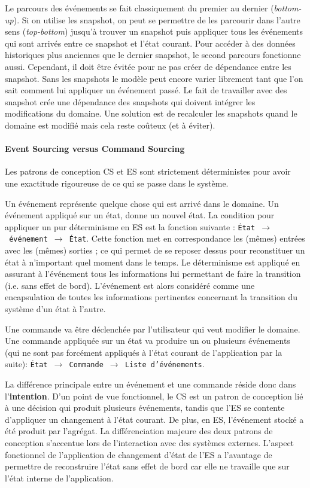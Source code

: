 Le parcours des événements se fait classiquement du premier au dernier 
(\textit{bottom-up}). Si on utilise les \gls{snapshot}, on peut se permettre de les 
parcourir dans l'autre sens (\textit{top-bottom}) jusqu'à trouver un \gls{snapshot} 
puis appliquer tous les événements qui sont arrivés entre ce \gls{snapshot} et 
l'état courant. Pour accéder à des données historiques 
plus anciennes que le dernier \gls{snapshot}, le second parcours fonctionne 
aussi. Cependant, il doit être évitée pour ne pas créer de dépendance entre 
les \gls{snapshot}. Sans les snapshots le modèle peut encore varier 
\og librement \fg{} tant que l'on sait comment lui appliquer un événement passé. 
Le fait de travailler avec des \gls{snapshot} crée une dépendance des 
snapshots qui doivent intégrer les modifications du domaine. Une solution est 
de recalculer les snapshots quand le domaine est modifié mais cela reste 
coûteux (et à éviter).

\paragraph{Event Sourcing versus Command Sourcing}
Les patrons de conception \gls{CS} et \gls{ES} sont strictement déterministes pour 
avoir une exactitude rigoureuse de ce qui se passe dans le système.

Un événement représente quelque chose qui est arrivé dans le domaine. Un 
événement appliqué sur un état, donne un nouvel état. 
La condition pour appliquer un pur déterminisme en \gls{ES} est la fonction 
suivante : \texttt{État~$\rightarrow$~événement~$\rightarrow$~État}. 
Cette fonction met en correspondance les (mêmes) entrées avec les (mêmes) 
sorties ; ce qui permet de se reposer dessus pour reconstituer un état à 
n'important quel moment dans le temps. 
Le déterminisme est appliqué en assurant à l'événement tous les 
informations lui permettant de faire la transition (i.e. sans effet de bord). 
L'événement est alors considéré comme une encapsulation de toutes les 
informations pertinentes concernant la transition du système d'un état à l'autre.

Une commande va être déclenchée par l'utilisateur qui veut modifier le domaine. 
Une commande appliquée sur un état va produire un ou plusieurs événements (qui 
ne sont pas forcément appliqués à l'état courant de l'application par la suite): 
\texttt{État~$\rightarrow$~Commande $\rightarrow$~Liste d'événements}.

La différence principale entre un événement et une commande réside donc dans 
l'\textbf{inten\-tion}. D'un point de vue fonctionnel, le \gls{CS} est un patron de 
conception lié à une décision qui produit plusieurs événements, tandis que 
l'\gls{ES} se contente d'appliquer un changement à l'état courant. De plus, en 
\gls{ES}, l'événement stocké a été produit par l'agrégat. 
La différenciation majeure des deux patrons de conception s'accentue lors de 
l'interaction avec des systèmes externes. L'aspect fonctionnel de l'application de 
changement d'état de l'\gls{ES} a l'avantage de permettre de reconstruire l'état sans 
effet de bord car elle ne travaille que sur l'état interne de l'application. 

